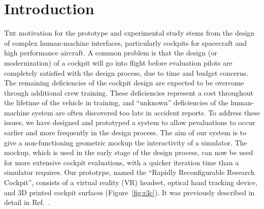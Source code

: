 \documentclass[]{aiaa-tc}%
\begin{document}
\section{Introduction}
\lettrine[nindent=0pt]{T}{he} motivation for the prototype and experimental study stems from the design of complex human-machine interfaces, particularly cockpits for spacecraft and high performance aircraft.
A common problem is that the design (or modernization) of a cockpit will go into flight before evaluation pilots are completely satisfied with the design process, due to time and budget concerns.
The remaining deficiencies of the cockpit design are expected to be overcome through additional crew training.
These deficiencies represent a cost throughout the lifetime of the vehicle in training, and ``unknown'' deficiencies of the human-machine system are often discovered too late in accident reports.
To address these issues, we have designed and prototyped a system to allow pevaluations to occur earlier and more frequently in the design process.
The aim of our system is to give a non-functioning geometric mockup the interactivity of a simulator.
The mockup, which is used in the early stage of the design process, can now be used for more extensive cockpit evaluations, with a quicker iteration time than a simulator requires.
Our prototype, named the ``Rapidly Reconfigurable Research Cockpit'', consists of a virtual reality (VR) headset, optical hand tracking device, and 3D printed cockpit surfaces (Figure~\ref{fig:r3c}).
It was previously described in detail in Ref.~\cite{joyce_rapidly_2015}.
\end{document}
